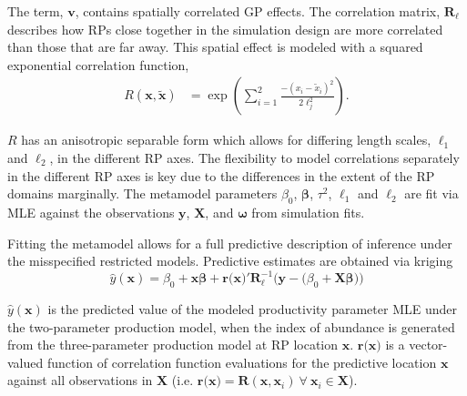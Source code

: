 The term, $\bm{v}$, contains spatially correlated GP effects. The correlation
matrix, $\bm{R_{\ell}}$ describes how RPs close together in the simulation design
are more correlated than those that are far away. This spatial effect is modeled
with a squared exponential correlation function,
%
\begin{align}   \label{corModel}
R(\bm{x}, \bm{\tilde x}) &= \exp\left( \sum_{i=1}^2 \frac{-(x_{i}-\tilde x_{i})^2}{2\ell_j^2} \right).
\end{align}

$R$ has an anisotropic separable form which allows for differing length scales,
$\ell_1$ and $\ell_2$, in the different RP axes. The flexibility to model
correlations separately in the different RP axes is key due to the differences
in the extent of the RP domains marginally.
The metamodel parameters $\beta_0$, $\bm{\beta}$, $\tau^2$,
$\ell_1$ and $\ell_2$ are fit via MLE against the observations $\textbf{y}$, $\bm{X}$,
and $\bm{\omega}$ from simulation fits.

%
Fitting the metamodel allows for a full predictive description of inference
under the misspecified restricted models.
Predictive estimates are obtained via kriging \cite{cressie_statistics_2015} %
\begin{equation} %
        \hat y(\textbf{x}) = \beta_0 + \textbf{x}\bm{\beta} + \textbf{r(x)}'\bm{R}^{-1}_{\bm{\ell}}\Big(\textbf{y}-\big(\beta_0+\bm{X}\bm{\beta}\big)\Big)
\end{equation}

%
$\hat y(\textbf{x})$ is the predicted value of the modeled productivity parameter
MLE under the two-parameter production model, when the index of abundance %
is generated from the three-parameter production model at RP location $\textbf{x}$.
$\textbf{r(x)}$ is a vector-valued function of correlation function evaluations for the
predictive location $\textbf{x}$ against all observations in $\bm{X}$
(i.e. $\textbf{r(x)}=\bm{R}(\textbf{x}, \bm{x}_i)~\forall~\bm{x}_i\in\bm{X}$).

